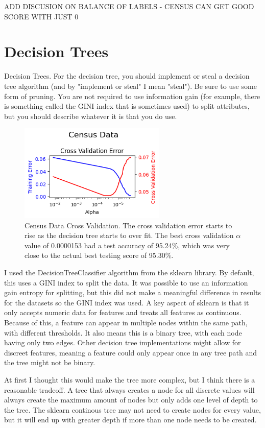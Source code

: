 \documentclass[letterpaper]{article} %
\begin{document}
ADD DISCUSION ON BALANCE OF LABELS - CENSUS CAN GET GOOD SCORE WITH JUST 0

\section{Decision Trees}
Decision Trees. For the decision tree, you should implement or steal a decision tree algorithm (and by "implement or steal" I mean "steal"). Be sure to use some form of pruning. You are not required to use information gain (for example, there is something called the GINI index that is sometimes used) to split attributes, but you should describe whatever it is that you do use.

\begin{figure}[htb]
\centering
\includegraphics[width=2.75in]{figures/Census_Data_decision_tree_cross_validation.png}
\caption{Census Data Cross Validation.  The cross validation error starts to rise as the decision tree starts to over fit.  The best cross validation $\alpha$ value of 0.0000153 had a test accuracy of 95.24\%, which was very close to the actual best testing score of 95.30\%. }
\label{fig:census_data_decision_tree_cross_validation}
\end{figure}

I used the DecisionTreeClassifier algorithm from the sklearn library.  By default, this uses a GINI index to split the data.  It was possible to use an information gain entropy for splitting, but this did not make a meaningful difference in results for the datasets so the GINI index was used.  A key aspect of sklearn is that it only accepts numeric data for features and treats all features as continuous.  Because of this, a feature can appear in multiple nodes within the same path, with different thresholds.  It also means this is a binary tree, with each node having only two edges.  Other decision tree implementations might allow for discreet features, meaning a feature could only appear once in any tree path and the tree might not be binary.  

At first I thought this would make the tree more complex, but I think there is a reasonable tradeoff.  A tree that always creates a node for all discrete values will always create the maximum amount of nodes but only adds one level of depth to the tree.  The sklearn continous tree may not need to create nodes for every value, but it will end up with greater depth if more than one node needs to be created.  
\end{document}

